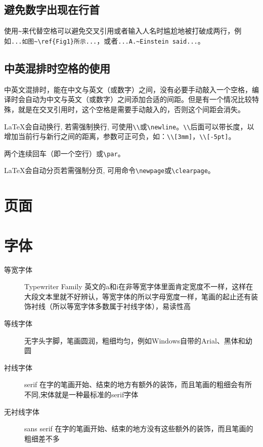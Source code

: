 {\subsection*{避免数字出现在行首}
使用\lstinline|~|来代替空格可以避免交叉引用或者输入人名时尴尬地被打破成两行，例如\lstinline|...如图~\ref{Fig1}所示...|，或者\lstinline|...A.~Einstein said...|。

\subsection*{中英混排时空格的使用}
中英文混排时，\XeLaTeX{}能在中文与英文（或数字）之间，没有必要手动敲入一个空格，编译时会自动为中文与英文（或数字）之间添加合适的间距。但是有一个情况比较特殊，就是在交叉引用时，这个空格是需要手动敲入的，否则这个间距会消失。

\begin{description}[labelwidth=4em]
    \item[换行] \LaTeX{}会自动换行, 若需强制换行, 可使用\lstinline|\\|或\lstinline|\newline|。\lstinline|\\|后面可以带长度，以增加当前行与新行之间的距离，参数可正可负，如：\lstinline|\\[3mm]|，\lstinline|\\[-5pt]|。
    \item[分段] 两个连续回车（即一个空行）或\lstinline|\par|。
    \item[分页] \LaTeX{}会自动分页若需强制分页, 可用命令\lstinline|\newpage|或\lstinline|\clearpage|。
\end{description}

\section{页面}

\section{字体}

\begin{description}
    \item[等宽字体] Typewriter Family 英文的a和i在非等宽字体里面肯定宽度不一样，这样在大段文本里就不好辨认，等宽字体的所以字母宽度一样，笔画的起止还有装饰衬线（所以等宽字体多数属于衬线字体），易读性高
    \item[等线字体] 无字头字脚，笔画圆润，粗细均匀，例如Windows自带的Arial、黑体和幼圆
    \item[衬线字体] serif 在字的笔画开始、结束的地方有额外的装饰，而且笔画的粗细会有所不同,宋体就是一种最标准的serif字体
    \item[无衬线字体] sans serif 在字的笔画开始、结束的地方没有这些额外的装饰，而且笔画的粗细差不多
\end{description}

}
